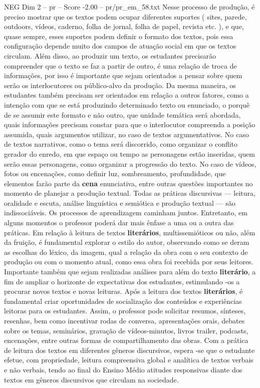 \begin{textsample}{NEG Dim 2 – pr – Score -2.00 – pr/pr\_em\_58.txt}
Nesse processo de produção, é preciso mostrar que os textos podem ocupar diferentes suportes ( sites, parede, outdoors, vídeos, caderno, folha de jornal, folha de papel, revista etc. ), e que, quase sempre, esses suportes podem definir o formato dos textos, pois essa configuração depende muito dos campos de atuação social em que os textos circulam.
Além disso, ao produzir um texto, os estudantes precisarão compreender que o texto se faz a partir de outro, é uma relação de troca de informações, por isso é importante que sejam orientados a pensar sobre quem serão os interlocutores ou público-alvo da produção.
Da mesma maneira, os estudantes também precisam ser orientados em relação a outros fatores, como a intenção com que se está produzindo determinado texto ou enunciado, o porquê de se assumir este formato e não outro, que unidade temática será abordada, quais informações precisam constar para que o interlocutor compreenda a posição assumida, quais argumentos utilizar, no caso de textos argumentativos.
No caso de textos narrativos, como o tema será discorrido, como organizar o conflito gerador do enredo, em que espaço ou tempo as personagens estão inseridas, quem serão essas personagens, como organizar a progressão do texto.
No caso de vídeos, fotos ou encenações, como definir luz, sombreamento, profundidade, que elementos farão parte da \textbf{cena} enunciativa, entre outras questões importantes no momento de planejar a produção textual.
Todas as práticas discursivas — leitura, oralidade e escuta, análise linguística e semiótica e produção textual — são indissociáveis.
Os processos de aprendizagem caminham juntos.
Entretanto, em alguns momentos o professor poderá dar mais ênfase a uma ou a outra das práticas.
Em relação à leitura de textos \textbf{literários}, multissemióticos ou não, além da fruição, é fundamental explorar o estilo do autor, observando como se deram as escolhas do léxico, da imagem, qual a relação da obra com o seu contexto de produção ou com o momento atual, como essa obra foi recebida por seus leitores.
Importante também que sejam realizadas análises para além do texto \textbf{literário}, a fim de ampliar o horizonte de expectativas dos estudantes, estimulando -os a procurar novos textos e novas leituras.
Após a leitura dos textos \textbf{literários}, é fundamental criar oportunidades de socialização dos conteúdos e experiências leitoras para os estudantes.
Assim, o professor pode solicitar resumos, sínteses, resenhas, bem como incentivar rodas de conversa, apresentações orais, debates sobre os temas, seminários, gravação de vídeos-minutos, livros trailer, podcasts, encenações, entre outras formas de compartilhamento das obras.
Com a prática de leitura dos textos em diferentes gêneros discursivos, espera -se que o estudante efetue, com propriedade, leitura compreensiva global e analítica de textos verbais e não verbais, tendo ao final do Ensino Médio atitudes responsivas diante dos textos em gêneros discursivos que circulam na sociedade.

\end{textsample}
